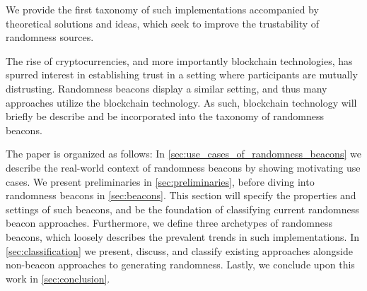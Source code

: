 We provide the first taxonomy of such implementations accompanied by theoretical solutions and ideas, which seek to improve the trustability of randomness sources.

The rise of cryptocurrencies, and more importantly blockchain technologies, has spurred interest in establishing trust in a setting where participants are mutually distrusting.
Randomness beacons display a similar setting, and thus many approaches utilize the blockchain technology.
As such, blockchain technology will briefly be describe and be incorporated into the taxonomy of randomness beacons.

The paper is organized as follows:
In \cref{sec:use_cases_of_randomness_beacons} we describe the real-world context of randomness beacons by showing motivating use cases.
We present preliminaries in \cref{sec:preliminaries}, before diving into randomness beacons in \cref{sec:beacons}.
This section will specify the properties and settings of such beacons, and be the foundation of classifying current randomness beacon approaches.
Furthermore, we define three archetypes of randomness beacons, which loosely describes the prevalent trends in such implementations.
In \cref{sec:classification} we present, discuss, and classify existing approaches alongside non-beacon approaches to generating randomness. 
Lastly, we conclude upon this work in \cref{sec:conclusion}.


